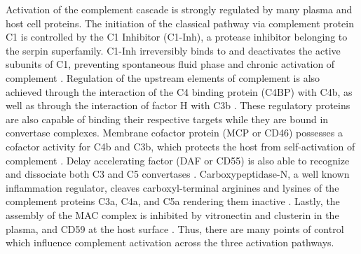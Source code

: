 \documentclass[12pt]{article}
\begin{document}
Activation of the complement cascade is strongly regulated by many plasma and host cell proteins.
The initiation of the classical pathway via complement protein C1 is controlled by the C1 Inhibitor (C1-Inh), a protease inhibitor belonging to the serpin superfamily.
C1-Inh irreversibly binds to and deactivates the active subunits of C1, preventing spontaneous fluid phase and chronic activation of complement \cite{walker1995complement}.
Regulation of the upstream elements of complement is also achieved through the interaction of the C4 binding protein (C4BP) with C4b, as well as
through the interaction of factor H with C3b \cite{blom2001structural}.
These regulatory proteins are also capable of binding their respective targets while they are bound in convertase complexes.
Membrane cofactor protein (MCP or CD46) possesses a cofactor activity for C4b and C3b, which protects the host from self-activation of complement \cite{riley2004cd46}.
Delay accelerating factor (DAF or CD55) is also able to recognize and dissociate both C3 and C5 convertases \cite{lukacik2004complement}.
Carboxypeptidase-N, a well known inflammation regulator, cleaves carboxyl-terminal arginines and lysines of the complement proteins C3a, C4a, and C5a rendering them inactive \cite{liszewski1995control}. Lastly, the assembly of the MAC complex is inhibited by vitronectin and clusterin in the plasma, and CD59 at the host surface \cite{chauhan2006presence,zewde2016quantitative}.
Thus, there are many points of control which influence complement activation across the three activation pathways.
\end{document}
